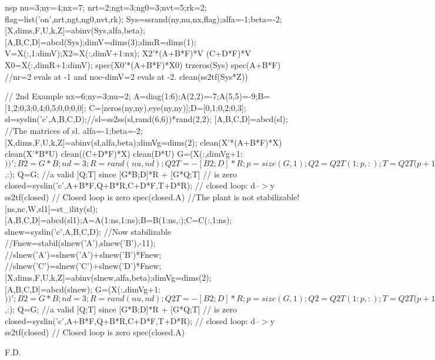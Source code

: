 \begin{examples}
  \begin{mintednsp}{nsp}
    nu=3;ny=4;nx=7;
    nrt=2;ngt=3;ng0=3;nvt=5;rk=2;
    flag=list('on',nrt,ngt,ng0,nvt,rk);
    Sys=ssrand(ny,nu,nx,flag);alfa=-1;beta=-2;
    [X,dims,F,U,k,Z]=abinv(Sys,alfa,beta);
    [A,B,C,D]=abcd(Sys);dimV=dims(3);dimR=dims(1);
    V=X(:,1:dimV);X2=X(:,dimV+1:nx);
    X2'*(A+B*F)*V
    (C+D*F)*V
    X0=X(:,dimR+1:dimV); spec(X0'*(A+B*F)*X0)
    trzeros(Sys)
    spec(A+B*F)   //nr=2 evals at -1 and noc-dimV=2 evals at -2.
    clean(ss2tf(Sys*Z))

    // 2nd Example
    nx=6;ny=3;nu=2;
    A=diag(1:6);A(2,2)=-7;A(5,5)=-9;B=[1,2;0,3;0,4;0,5;0,0;0,0];
    C=[zeros(ny,ny),eye(ny,ny)];D=[0,1;0,2;0,3];
    sl=syslin('c',A,B,C,D);//sl=ss2ss(sl,rand(6,6))*rand(2,2);
    [A,B,C,D]=abcd(sl);  //The matrices of sl.
    alfa=-1;beta=-2;
    [X,dims,F,U,k,Z]=abinv(sl,alfa,beta);dimVg=dims(2);
    clean(X'*(A+B*F)*X)
    clean(X'*B*U)
    clean((C+D*F)*X)
    clean(D*U)
    G=(X(:,dimVg+1:$))';
    B2=G*B;nd=3;
    R=rand(nu,nd);Q2T=-[B2;D]*R;
    p=size(G,1);Q2=Q2T(1:p,:);T=Q2T(p+1:$,:);
    Q=G;   //a valid [Q;T] since 
    [G*B;D]*R + [G*Q;T]  // is zero
    closed=syslin('c',A+B*F,Q+B*R,C+D*F,T+D*R); // closed loop: d--$>$y
    ss2tf(closed)       // Closed loop is zero
    spec(closed.A)   //The plant is not stabilizable!
    [ns,nc,W,sl1]=st_ility(sl);
    [A,B,C,D]=abcd(sl1);A=A(1:ns,1:ns);B=B(1:ns,:);C=C(:,1:ns);
    slnew=syslin('c',A,B,C,D);  //Now stabilizable
    //Fnew=stabil(slnew('A'),slnew('B'),-11);
    //slnew('A')=slnew('A')+slnew('B')*Fnew;
    //slnew('C')=slnew('C')+slnew('D')*Fnew;
    [X,dims,F,U,k,Z]=abinv(slnew,alfa,beta);dimVg=dims(2);
    [A,B,C,D]=abcd(slnew);
    G=(X(:,dimVg+1:$))';
    B2=G*B;nd=3;
    R=rand(nu,nd);Q2T=-[B2;D]*R;
    p=size(G,1);Q2=Q2T(1:p,:);T=Q2T(p+1:$,:);
    Q=G;   //a valid [Q;T] since 
    [G*B;D]*R + [G*Q;T]  // is zero
    closed=syslin('c',A+B*F,Q+B*R,C+D*F,T+D*R); // closed loop: d--$>$y
    ss2tf(closed)       // Closed loop is zero
    spec(closed.A)
  \end{mintednsp}
\end{examples}
\begin{manseealso}
     
     
\end{manseealso}
\begin{authors}
  F.D.  
\end{authors}
